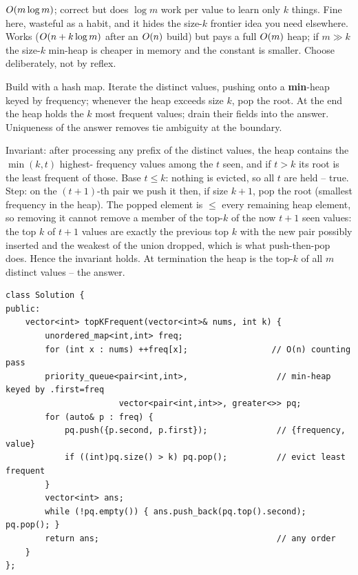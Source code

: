 \begin{thinkbox}
{$O(m\log m)$; correct but does $\log m$ work per value to learn only $k$ things. Fine here, wasteful
as a habit, and it hides the size-$k$ frontier idea you need elsewhere.}
{Works ($O(n + k\log m)$ after an $O(n)$ build) but pays a full $O(m)$ heap; if $m\gg k$ the
size-$k$ min-heap is cheaper in memory and the constant is smaller. Choose deliberately, not by reflex.}
\end{thinkbox}

Build  with a hash map. Iterate the distinct values, pushing  onto a
\textbf{min}-heap keyed by frequency; whenever the heap exceeds size $k$, pop the root. At the end the heap
holds the $k$ most frequent values; drain their  fields into the answer. Uniqueness of the
answer removes tie ambiguity at the boundary.

\begin{proofbox}
Invariant: after processing any prefix of the distinct values, the heap contains the $\min(k, t)$ highest-
frequency values among the $t$ seen, and if $t>k$ its root is the least frequent of those. Base $t\le k$:
nothing is evicted, so all $t$ are held -- true. Step: on the $(t{+}1)$-th pair we push it then, if size $k{+}1$,
pop the root (smallest frequency in the heap). The popped element is $\le$ every remaining heap element, so
removing it cannot remove a member of the top-$k$ of the now $t{+}1$ seen values: the top $k$ of $t{+}1$
values are exactly the previous top $k$ with the new pair possibly inserted and the weakest of the union
dropped, which is what push-then-pop does. Hence the invariant holds. At termination the heap is the
top-$k$ of all $m$ distinct values -- the answer. \end{proofbox}

\begin{lstlisting}[caption={Top K Frequent Elements -- size-k min-heap over frequency pairs (LeetCode 347)}, label={lst:c07-topk-soln}]
class Solution {
public:
    vector<int> topKFrequent(vector<int>& nums, int k) {
        unordered_map<int,int> freq;
        for (int x : nums) ++freq[x];                 // O(n) counting pass
        priority_queue<pair<int,int>,                  // min-heap keyed by .first=freq
                       vector<pair<int,int>>, greater<>> pq;
        for (auto& p : freq) {
            pq.push({p.second, p.first});              // {frequency, value}
            if ((int)pq.size() > k) pq.pop();          // evict least frequent
        }
        vector<int> ans;
        while (!pq.empty()) { ans.push_back(pq.top().second); pq.pop(); }
        return ans;                                    // any order
    }
};
\end{lstlisting}

